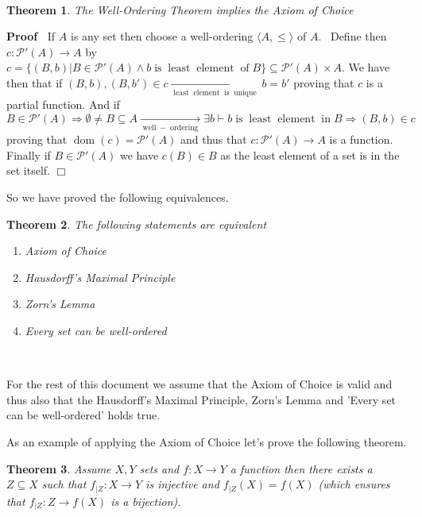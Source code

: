 \documentclass{book}
\newcommand{\Rightarrowlim}{\mathop{\rightarrow}\limits}
\newcommand{\nobracket}{}
\newcommand{\tmop}[1]{\ensuremath{\operatorname{#1}}}
\newcommand{\um}{-}
\newenvironment{proof}{\noindent\textbf{Proof\ }}{\hspace*{\fill}$\Box$\medskip}
\newtheorem{theorem}{Theorem}
\begin{document}
{{\

\begin{theorem}
  The Well-Ordering Theorem implies the Axiom of Choice
\end{theorem}

\begin{proof}
  If $A$ is any set then choose a well-ordering $\langle A, \leqslant \rangle$
  of $A$. \ Define then $c : \mathcal{P}' (A) \rightarrow A$ by $c = \{ (B, b)
  | B \in \mathcal{P}' (A) \wedge b \tmop{is} \tmop{least} \tmop{element}
  \tmop{of} B \nobracket \} \subseteq \mathcal{P}' (A) \times A$. We have then
  that if $(B, b), (B, b') \in c \Rightarrowlim_{\tmop{least} \tmop{element}
  \tmop{is} \tmop{unique}} b = b'$ proving that $c$ is a partial function. And
  if $B \in \mathcal{P}' (A) \Rightarrow \emptyset \neq B \subseteq A
  \Rightarrowlim_{\tmop{well} \um \tmop{ordering}} \exists b \vdash b
  \tmop{is} \tmop{least} \tmop{element} \tmop{in} B \Rightarrow (B, b) \in c$
  proving that $\tmop{dom} (c) =\mathcal{P}' (A)$ and thus that $c :
  \mathcal{P}' (A) \rightarrow A$ is a function. Finally if $B \in
  \mathcal{P}' (A)$ we have $c (B) \in B$ as the least element of a set is in
  the set itself.
\end{proof}

So we have proved the following equivalences.

\begin{theorem}
  The following statements are equivalent
  \begin{enumerate}
    \item Axiom of Choice
    
    \item Hausdorff's Maximal Principle
    
    \item Zorn's Lemma
    
    \item Every set can be well-ordered
  \end{enumerate}
\end{theorem}

\

For the rest of this document we assume that the Axiom of Choice is valid and
thus also that the Hausdorff's Maximal Principle, Zorn's Lemma and 'Every set
can be well-ordered' holds true.

As an example of applying the Axiom of Choice let's prove the following
theorem.

\begin{theorem}
  \label{use domain restriction to make a function injective}Assume $X, Y$
  sets and $f : X \rightarrow Y$ a function then there exists a $Z \subseteq
  X$ such that $f_{|Z} : X \rightarrow Y$ is injective and $f_{|Z} (X) = f
  (X)$ (which ensures that $f_{|Z} : Z \rightarrow f (X)$ is a bijection).
\end{theorem}

}}
\end{document}
